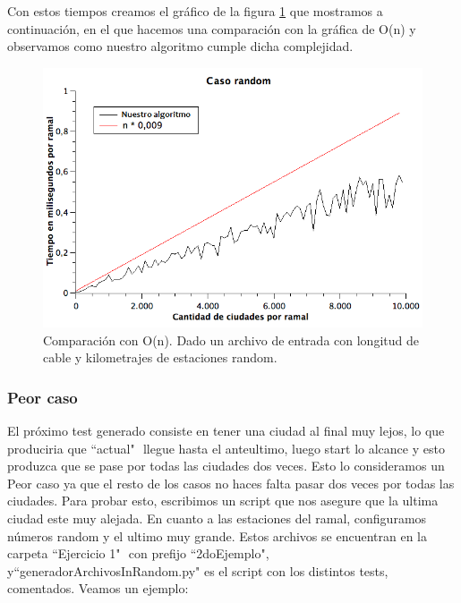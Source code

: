 Con estos tiempos creamos el gráfico de la figura \ref{ej1-tiempo-vs-cant-ciudades-random} que mostramos a continuación, en el que hacemos una comparación con la gráfica de O(n) y observamos como nuestro algoritmo cumple dicha complejidad.

\begin{figure}[H]
\begin{center}

  \includegraphics[width=\linewidth]{../graficos/ej1/CasoRandom.png}
  \caption{{\small Comparación con O(n). Dado un archivo de entrada con longitud de cable y kilometrajes de estaciones random.}} \label{ej1-tiempo-vs-cant-ciudades-random}
\endminipage

\end{center}
\end{figure}


\subsubsection{Peor caso}

El próximo test generado consiste en tener una ciudad al final muy lejos, lo que produciria que ``actual" $ $ llegue hasta el anteultimo, luego start lo alcance y esto produzca que se pase por todas las ciudades dos veces. Esto lo consideramos un Peor caso ya que el resto de los casos no haces falta pasar dos veces por todas las ciudades.  Para probar esto, escribimos un script que nos asegure que la ultima ciudad este muy alejada. En cuanto a las estaciones del ramal, configuramos números random y el ultimo muy grande. Estos archivos se encuentran en la carpeta ``Ejercicio 1" $ $ con prefijo ``2doEjemplo", y``generadorArchivosInRandom.py" $ $es el script con los distintos tests, comentados. Veamos un ejemplo:\\

